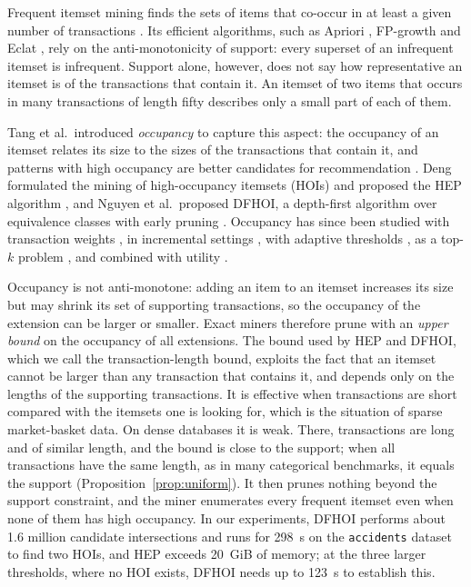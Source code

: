 \documentclass[pdflatex,sn-mathphys,Numbered]{sn-jnl}
\theoremstyle{thmstyleone}
\theoremstyle{thmstyletwo}
\theoremstyle{thmstylethree}
\begin{document}
Frequent itemset mining finds the sets of items that co-occur in at least a given number of transactions \cite{agrawal1993mining,agrawal1994fast}. Its efficient algorithms, such as Apriori \cite{agrawal1994fast}, FP-growth \cite{han2000mining} and Eclat \cite{zaki1997new,zaki2000scalable}, rely on the anti-monotonicity of support: every superset of an infrequent itemset is infrequent. Support alone, however, does not say how representative an itemset is of the transactions that contain it. An itemset of two items that occurs in many transactions of length fifty describes only a small part of each of them.

Tang et al.\ introduced \emph{occupancy} to capture this aspect: the occupancy of an itemset relates its size to the sizes of the transactions that contain it, and patterns with high occupancy are better candidates for recommendation \cite{tang2012occupancy}. Deng formulated the mining of high-occupancy itemsets (HOIs) and proposed the HEP algorithm \cite{deng2020hoi}, and Nguyen et al.\ proposed DFHOI, a depth-first algorithm over equivalence classes with early pruning \cite{nguyen2023dfhoi}. Occupancy has since been studied with transaction weights \cite{datta2022hoimto}, in incremental settings \cite{kim2022incremental}, with adaptive thresholds \cite{tran2025namhep}, as a top-$k$ problem \cite{yildirim2025topk}, and combined with utility \cite{gan2020huopm,kumar2024hauopm,cho2024incremental}.

Occupancy is not anti-monotone: adding an item to an itemset increases its size but may shrink its set of supporting transactions, so the occupancy of the extension can be larger or smaller. Exact miners therefore prune with an \emph{upper bound} on the occupancy of all extensions. The bound used by HEP and DFHOI, which we call the transaction-length bound, exploits the fact that an itemset cannot be larger than any transaction that contains it, and depends only on the lengths of the supporting transactions. It is effective when transactions are short compared with the itemsets one is looking for, which is the situation of sparse market-basket data. On dense databases it is weak. There, transactions are long and of similar length, and the bound is close to the support; when all transactions have the same length, as in many categorical benchmarks, it equals the support (Proposition~\ref{prop:uniform}). It then prunes nothing beyond the support constraint, and the miner enumerates every frequent itemset even when none of them has high occupancy. In our experiments, DFHOI performs about 1.6 million candidate intersections and runs for 298~s on the \texttt{accidents} dataset to find two HOIs, and HEP exceeds 20~GiB of memory; at the three larger thresholds, where no HOI exists, DFHOI needs up to 123~s to establish this.
\end{document}
